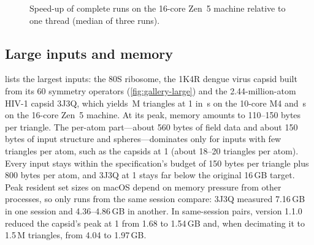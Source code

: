 \begin{figure}[t]
  \centering
  \caption{Speed-up of complete \sesmesh{} runs on the 16-core Zen~5
    machine relative to one thread (median of three runs).}
  \label{fig:x86-scaling}
\end{figure}

\subsection{Large inputs and memory}
\label{sec:large}

 lists the largest inputs: the 80S ribosome, the 1K4R
dengue virus capsid built from its 60 symmetry operators
(\cref{fig:gallery-large}) and the 2.44-million-atom HIV-1 capsid 3J3Q,
which yields \,M triangles at 1\Ang{} in
\,s on the 10-core M4 and \,s on
the 16-core Zen~5 machine. At its peak, memory amounts to 110--150 bytes
per triangle. The per-atom part---about 560 bytes of field data and about
150 bytes of input structure and spheres---dominates only for inputs with
few triangles per atom, such as the capsids at 1\Ang{} (about 18--20
triangles per atom). Every input stays within the specification's budget
of 150 bytes per triangle plus 800 bytes per atom, and 3J3Q at 1\Ang{}
stays far below the original 16\,GB target. Peak resident set sizes on
macOS depend on memory pressure from other processes, so only runs from the
same session compare: 3J3Q measured 7.16\,GB in one session and
4.36--4.86\,GB in another. In same-session pairs, version 1.1.0 reduced the
capsid's peak at 1\Ang{} from 1.68 to 1.54\,GB and, when decimating it to
1.5\,M triangles, from 4.04 to 1.97\,GB.

